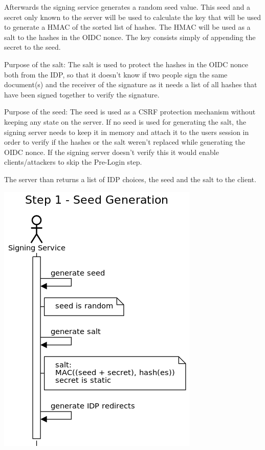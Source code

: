 Afterwards the signing service generates a random seed value. This seed and a secret only known to the server will be used to calculate the key that will be used to generate a \gls{HMAC} of the sorted list of hashes. The \gls{HMAC} will be used as a salt to the hashes in the \gls{OIDC} nonce. The key consists simply of appending the secret to the seed.

Purpose of the salt:
The salt is used to protect the hashes in the \gls{OIDC} nonce both from the \gls{IDP}, so that it doesn't know if two people sign the same document(s) and the receiver of the signature as it needs a list of all hashes that have been signed together to verify the signature.

Purpose of the seed:
The seed is used as a \gls{CSRF} protection mechanism without keeping any state on the server.
If no seed is used for generating the salt, the signing server needs to keep it in memory and attach it to the users session in order to verify if the hashes or the salt weren't replaced while generating the \gls{OIDC} nonce.
If the signing server doesn't verify this it would enable clients/attackers to skip the Pre-Login step.

The server than returns a list of \gls{IDP} choices, the seed and the salt to the client.

\includegraphics[scale=0.5]{images/protocol_step1_seed_generation.png}

